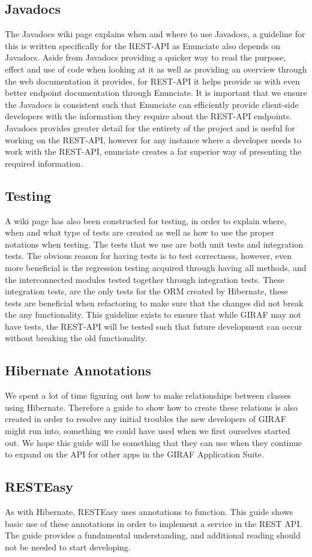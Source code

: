 \subsection{Javadocs}
The Javadocs wiki page explains when and where to use Javadocs, a guideline for this is written specifically for the REST-API as Enunciate also depends on Javadocs.
Aside from Javadocs providing a quicker way to read the purpose, effect and use of code when looking at it as well as providing an overview through the web documentation it provides, for REST-API it helps provide us with even better endpoint documentation through Enunciate.
It is important that we ensure the Javadocs is consistent such that Enunciate can efficiently provide client-side developers with the information they require about the REST-API endpoints.
Javadocs provides greater detail for the entirety of the project and is useful for working on the REST-API, however for any instance where a developer needs to work with the REST-API, enunciate creates a far superior way of presenting the required information.

\subsection{Testing}
A wiki page has also been constructed for testing, in order to explain where, when and what type of tests are created as well as how to use the proper notations when testing.
The tests that we use are both unit tests and integration tests.
The obvious reason for having tests is to test correctness, however, even more beneficial is the regression testing acquired through having all methods, and the interconnected modules tested together through integration tests.
These integration tests, are the only tests for the ORM created by Hibernate, these tests are beneficial when refactoring to make sure that the changes did not break the any functionality.
This guideline exists to ensure that while GIRAF may not have tests, the REST-API will be tested such that future development can occur without breaking the old functionality.

\subsection{Hibernate Annotations}
We spent a lot of time figuring out how to make relationships between classes using Hibernate.
Therefore a guide to show how to create these relations is also created in order to resolve any initial troubles the new developers of GIRAF might run into, something we could have used when we first ourselves started out.
We hope this guide will be something that they can use when they continue to expand on the API for other apps in the GIRAF Application Suite.

\subsection{RESTEasy}
As with Hibernate, RESTEasy uses annotations to function.
This guide shows basic use of these annotations in order to implement a service in the REST API.
The guide provides a fundamental understanding, and additional reading should not be needed to start developing.
